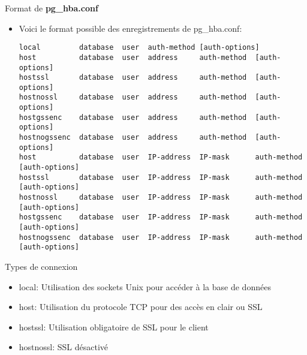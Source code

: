
\begin{frame}[fragile]{Format de \textbf{pg\_hba.conf}}

   \begin{itemize}
      \item Voici le format possible des enregistrements de pg\_hba.conf:
\begin{tiny}
\begin{Verbatim}[commandchars=\\\{\}]
local         database  user  auth-method [auth-options]
host          database  user  address     auth-method  [auth-options]
hostssl       database  user  address     auth-method  [auth-options]
hostnossl     database  user  address     auth-method  [auth-options]
hostgssenc    database  user  address     auth-method  [auth-options]
hostnogssenc  database  user  address     auth-method  [auth-options]
host          database  user  IP-address  IP-mask      auth-method  [auth-options]
hostssl       database  user  IP-address  IP-mask      auth-method  [auth-options]
hostnossl     database  user  IP-address  IP-mask      auth-method  [auth-options]
hostgssenc    database  user  IP-address  IP-mask      auth-method  [auth-options]
hostnogssenc  database  user  IP-address  IP-mask      auth-method  [auth-options]
\end{Verbatim}
\end{tiny}
   \end{itemize}

\end{frame}


\begin{frame}[fragile]{Types de connexion}

   \begin{itemize}
      \item local: Utilisation des sockets Unix pour accéder à la base de données
      \item host: Utilisation du protocole TCP pour des accès en clair ou SSL
      \item hostssl: Utilisation obligatoire de SSL pour le client
      \item hostnossl: SSL désactivé
   \end{itemize}

\end{frame}

